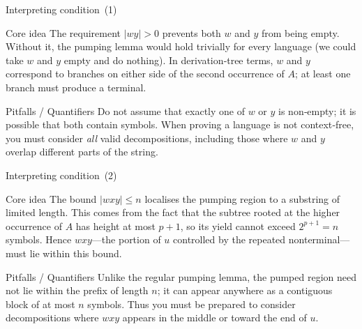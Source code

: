 \begin{frame}[t]{Interpreting condition (1)}
  \begin{tblock}{Core idea}
    The requirement $|w y| > 0$ prevents both $w$ and $y$ from being
    empty.  Without it, the pumping lemma would hold trivially for every
    language (we could take $w$ and $y$ empty and do nothing).  In
    derivation‑tree terms, $w$ and $y$ correspond to branches on either
    side of the second occurrence of $A$; at least one branch must
    produce a terminal.
  \end{tblock}
  \begin{talert}{Pitfalls / Quantifiers}
    Do not assume that exactly one of $w$ or $y$ is non‑empty; it is
    possible that both contain symbols.  When proving a language is not
    context‑free, you must consider \emph{all} valid decompositions,
    including those where $w$ and $y$ overlap different parts of the
    string.
  \end{talert}
  \label{fr:6.1-06}
\end{frame}

\begin{frame}[t]{Interpreting condition (2)}
  \begin{tblock}{Core idea}
    The bound $|w x y| \le n$ localises the pumping region to a
    substring of limited length.  This comes from the fact that the
    subtree rooted at the higher occurrence of $A$ has height at most
    $p+1$, so its yield cannot exceed $2^{p+1}=n$ symbols.  Hence $w x
    y$—the portion of $u$ controlled by the repeated nonterminal—must
    lie within this bound.
  \end{tblock}
  \begin{talert}{Pitfalls / Quantifiers}
    Unlike the regular pumping lemma, the pumped region need not lie
    within the prefix of length $n$; it can appear anywhere as a
    contiguous block of at most $n$ symbols.  Thus you must be prepared
    to consider decompositions where $w x y$ appears in the middle or
    toward the end of $u$.
  \end{talert}
  \label{fr:6.1-07}
\end{frame}

